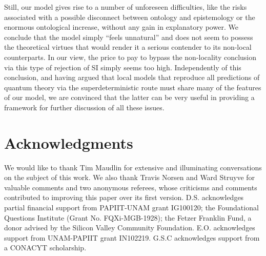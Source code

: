 \documentclass[letterpaper,12pt]{article}
\begin{document}
Still, our model gives rise to a number of unforeseen difficulties, like the risks associated with a possible disconnect between ontology and epistemology or the enormous ontological increase, without any gain in explanatory power. We conclude that the model simply ``feels unnatural'' and does not seem to possess the theoretical virtues that would render it a serious contender to its non-local counterparts. In our view, the price to pay to bypass the non-locality conclusion via this type of rejection of SI simply seems too high. Independently of this conclusion, and having argued that local models that reproduce all predictions of quantum theory via the superdeterministic route must share many of the features of our model, we are convinced that the latter can be very useful in providing a framework for further discussion of all these issues.

\section*{Acknowledgments}
We would like to thank Tim Maudlin for extensive and illuminating conversations on the subject of this work. We also thank Travis Norsen and Ward Struyve for valuable comments and two anonymous referees, whose criticisms and comments contributed to improving this paper over its first version. D.S. acknowledges partial financial support from PAPIIT-UNAM grant IG100120; the Foundational Questions Institute (Grant No. FQXi-MGB-1928); the Fetzer Franklin Fund, a donor advised by the Silicon Valley Community Foundation. E.O. acknowledges support from UNAM-PAPIIT grant IN102219. G.S.C acknowledges support from a CONACYT scholarship.


\end{document}
